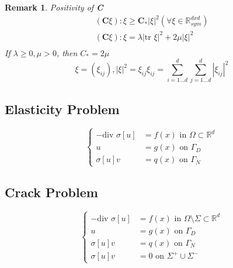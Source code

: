 \documentclass[a4paper,12pt]{article}
\newtheorem{remark}{Remark}[]
\newcommand{\R}{\mathbb{R}}
\begin{document}
\begin{remark}
Positivity of \textbf{C}
\begin{equation}\nonumber
\begin{aligned}
(\textbf{C} \xi) : \xi \geq \textbf{C}_* |\xi|^2 (\forall \xi \in \R^{d x d}_{sym})\\
(\textbf{C} \xi) : \xi = \lambda |\text{tr }\xi|^2 + 2\mu|\xi|^2\\
\end{aligned}
\end{equation}
If $\lambda \geq 0, \mu > 0$, then $C_* = 2 \mu$
\begin{equation}\nonumber
\xi = (\xi_{ij}), |\xi|^2 = \xi_{ij} \xi_{ij} = \sum_{i = 1 \dots d}^{d} \sum_{j = 1 \dots d}^{d} |\xi_{ij}|^2
\end{equation}
\end{remark}
\subsection{Elasticity Problem}
\begin{equation}
\begin{cases}
-\text{div } \sigma[u] &= f(x) \text{ in } \Omega \subset \R^d\\
u &= g(x) \text{ on } \Gamma_D\\
\sigma[u]v &= q(x) \text{ on } \Gamma_N
\end{cases}
\end{equation}
\subsection{Crack Problem}
\begin{equation}
\begin{cases}
-\text{div } \sigma[u] &= f(x) \text{ in } \Omega \setminus \Sigma \subset \R^d\\
u &= g(x) \text{ on } \Gamma_D\\
\sigma[u]v &= q(x) \text{ on } \Gamma_N\\
\sigma[u]v &= 0 \text{ on } \Sigma^+ \cup \Sigma^-
\end{cases}
\end{equation}
\end{document}
